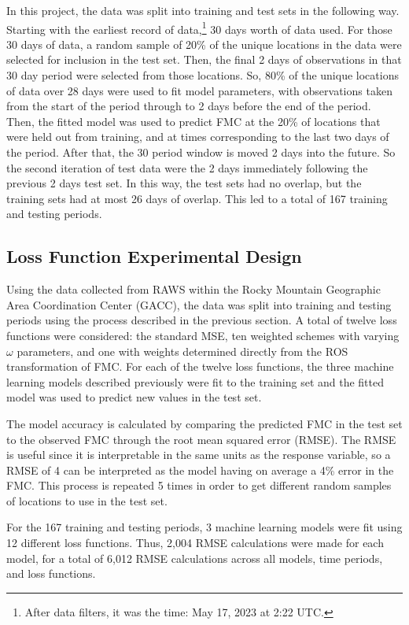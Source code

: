 \documentclass[11pt]{article}%
\begin{document}
In this project, the data was split into training and test sets in the following way. Starting with the earliest record of data,\footnote{After data filters, it was the time: May 17, 2023 at 2:22 UTC.} 30 days worth of data used. For those 30 days of data, a random sample of 20\% of the unique locations in the data were selected for inclusion in the test set. Then, the final 2 days of observations in that 30 day period were selected from those locations. So, 80\% of the unique locations of data over 28 days were used to fit model parameters, with observations taken from the start of the period through to 2 days before the end of the period. Then, the fitted model was used to predict FMC at the 20\% of locations that were held out from training, and at times corresponding to the last two days of the period. After that, the 30 period window is moved 2 days into the future. So the second iteration of test data were the 2 days immediately following the previous 2 days test set. In this way, the test sets had no overlap, but the training sets had at most 26 days of overlap. This led to a total of 167 training and testing periods.



\subsection{Loss Function Experimental Design}

Using the data collected from RAWS within the Rocky Mountain Geographic Area Coordination Center (GACC), the data was split into training and testing periods using the process described in the previous section. A total of twelve loss functions were considered: the standard MSE, ten weighted schemes with varying $\omega$ parameters, and one with weights determined directly from the ROS transformation of FMC. For each of the twelve loss functions, the three machine learning models described previously were fit to the training set and the fitted model was used to predict new values in the test set. 

The model accuracy is calculated by comparing the predicted FMC in the test set to the observed FMC through the root mean squared error (RMSE). The RMSE is useful since it is interpretable in the same units as the response variable, so a RMSE of 4 can be interpreted as the model having on average a 4\% error in the FMC. This process is repeated 5 times in order to get different random samples of locations to use in the test set. 

For the 167 training and testing periods, 3 machine learning models were fit using 12 different loss functions. Thus, 2,004 RMSE calculations were made for each model, for a total of 6,012 RMSE calculations across all models, time periods, and loss functions.
\end{document}
